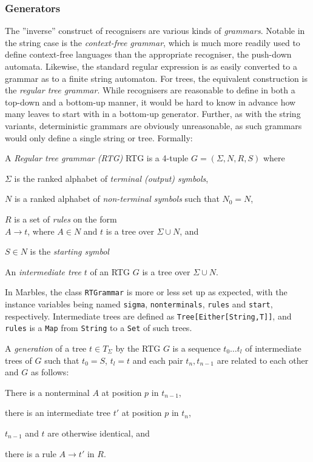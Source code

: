 \subsubsection{Generators}

The ''inverse'' construct of recognisers are various kinds of
\emph{grammars}. Notable in the string case is the \emph{context-free
  grammar}, which is much more readily used to define context-free
languages than the appropriate recogniser, the push-down automata.
Likewise, the standard regular expression is as easily converted to a
grammar as to a finite string automaton. For trees, the equivalent
construction is the \emph{regular tree grammar}. While recognisers are
reasonable to define in both a top-down and a bottom-up manner, it would be
hard to know in advance how many leaves to start with in a bottom-up
generator. Further, as with the string variants, deterministic grammars are
obviously unreasonable, as such grammars would only define a single string
or tree. Formally:

A \emph{Regular tree grammar (RTG)} RTG is a 4-tuple $G = (\Sigma, N, R, S)$ where
\begin{compactitem}
\item $\Sigma$ is the ranked alphabet of \emph{terminal (output) symbols},
\item $N$ is a ranked alphabet of \emph{non-terminal symbols} such that $N_0 = N$, 
\item $R$ is a set of \emph{rules} on the form\\
    $A \rightarrow t$, where $A \in N$ and $t$ is a tree over $\Sigma \cup N$, and
\item $S \in N$ is the \emph{starting symbol}
\end{compactitem}

An \emph{intermediate tree} $t$ of an RTG $G$ is a tree over $\Sigma \cup N$.

In Marbles, the class \texttt{RTGrammar} is more or less set up as
expected, with the instance variables being named \texttt{sigma},
\texttt{nonterminals}, \texttt{rules} and \texttt{start}, respectively.
Intermediate trees are defined as \texttt{Tree[Either[String,T]]}, and
\texttt{rules} is a \texttt{Map} from \texttt{String} to a \texttt{Set} of
such trees.

A \emph{generation} of a tree $t \in T_\Sigma$ by the RTG $G$ is a sequence $t_0\ldots
t_l$
of intermediate trees of $G$ such that $t_0 = S$, $t_l = t$ and each pair
$t_n, t_{n-1}$ are related to each other and $G$ as follows:
\begin{compactitem}
\item There is a nonterminal $A$ at position $p$ in $t_{n-1}$,
\item there is an intermediate tree $t'$ at position $p$ in $t_n$,
\item $t_{n-1}$ and $t$ are otherwise identical, and
\item there is a rule $A \rightarrow t'$ in $R$.
\end{compactitem}

